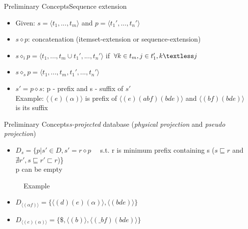\documentclass[12pt]{beamer}
\begin{document}
\begin{frame}{Preliminary Concepts}{Sequence extension}
\begin{itemize}
\item Given: $s = \langle t_1,...,t_m \rangle$ and $p = \langle t_1',...,t_n' \rangle$
\item $s \diamond p$: concatenation (itemset-extension or sequence-extension)
\item $s \diamond_i p = \langle t_1,...,t_m \cup t_1',...,t_n' \rangle$ if $\forall k \in t_m, j \in t_1', k \textless j$
\item $s \diamond_s p = \langle t_1,...,t_m,t_1',...,t_n' \rangle$
\item $s' = p \diamond s$: p - prefix and s - suffix of $s'$\\ Example: $\langle (e)(\alpha) \rangle$ is prefix of $\langle (e)(abf)(bde) \rangle$ and $\langle (bf)(bde) \rangle$ is its suffix
\end{itemize}
\end{frame}

\begin{frame}{Preliminary Concepts}{{\it s-projected} database ({\it physical projection } and {\it pseudo projection})}
\begin{itemize}
\item $D_s = \{p | s' \in D, s' = r \diamond p$ ~~s.t. r is minimum prefix containing s ($s \sqsubseteq r$ and $\nexists r',s \sqsubseteq r' \sqsubset r$)\}\\ p can be empty
\end{itemize}
\begin{figure}
\caption*{Example}
\end{figure}
\begin{itemize}
\item $D_{\langle (\alpha f) \rangle} = \{ \langle (d)(e)(\alpha) \rangle, \langle (bde) \rangle \}$
\item $D_{\langle (e)(\alpha) \rangle} = \{ \$,\langle (b) \rangle,\langle (\_bf)(bde) \rangle \}$
\end{itemize}
\end{frame}
\end{document}
